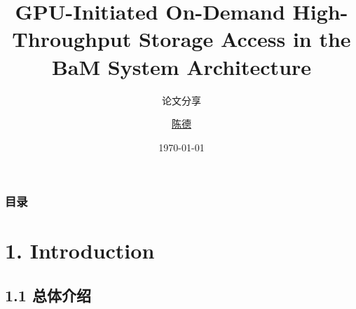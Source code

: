 \documentclass[10pt]{ctexbeamer}
\title[组会汇报]{GPU-Initiated On-Demand High-Throughput Storage Access in the BaM System Architecture}
\subtitle{论文分享}
\author[D.\,Chen]{\href{chende23@mails.ucas.ac.cn}{陈德}}
\date[\today]{\today}
\begin{document}
\begin{frame}[plain]
  \maketitle
\end{frame}

\begin{frame}[t]
  \frametitle{目录}
  \tableofcontents
\end{frame}

\section[1.Introduction]{1. Introduction}\label{sec:1}
\subsection[1.1 General]{1.1 总体介绍}\label{subsec:1-1}
\end{document}
